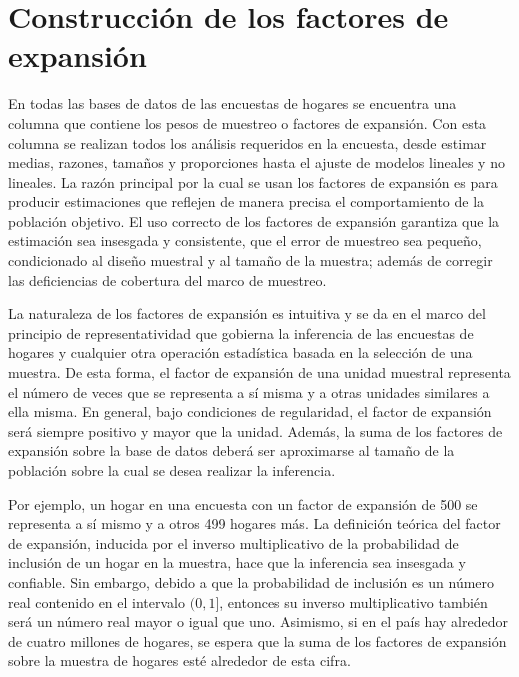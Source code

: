 \documentclass[
  12pt,
]{book}
\begin{document}
\hypertarget{construcciuxf3n-de-los-factores-de-expansiuxf3n}{%
\chapter{Construcción de los factores de expansión}\label{construcciuxf3n-de-los-factores-de-expansiuxf3n}}

En todas las bases de datos de las encuestas de hogares se encuentra una columna que contiene los pesos de muestreo o factores de expansión. Con esta columna se realizan todos los análisis requeridos en la encuesta, desde estimar medias, razones, tamaños y proporciones hasta el ajuste de modelos lineales y no lineales. La razón principal por la cual se usan los factores de expansión es para producir estimaciones que reflejen de manera precisa el comportamiento de la población objetivo. El uso correcto de los factores de expansión garantiza que la estimación sea insesgada y consistente, que el error de muestreo sea pequeño, condicionado al diseño muestral y al tamaño de la muestra; además de corregir las deficiencias de cobertura del marco de muestreo.

La naturaleza de los factores de expansión es intuitiva y se da en el marco del principio de representatividad que gobierna la inferencia de las encuestas de hogares y cualquier otra operación estadística basada en la selección de una muestra. De esta forma, el factor de expansión de una unidad muestral representa el número de veces que se representa a sí misma y a otras unidades similares a ella misma. En general, bajo condiciones de regularidad, el factor de expansión será siempre positivo y mayor que la unidad. Además, la suma de los factores de expansión sobre la base de datos deberá ser aproximarse al tamaño de la población sobre la cual se desea realizar la inferencia.

Por ejemplo, un hogar en una encuesta con un factor de expansión de 500 se representa a sí mismo y a otros 499 hogares más. La definición teórica del factor de expansión, inducida por el inverso multiplicativo de la probabilidad de inclusión de un hogar en la muestra, hace que la inferencia sea insesgada y confiable. Sin embargo, debido a que la probabilidad de inclusión es un número real contenido en el intervalo \((0, 1]\), entonces su inverso multiplicativo también será un número real mayor o igual que uno. Asimismo, si en el país hay alrededor de cuatro millones de hogares, se espera que la suma de los factores de expansión sobre la muestra de hogares esté alrededor de esta cifra.
\end{document}
